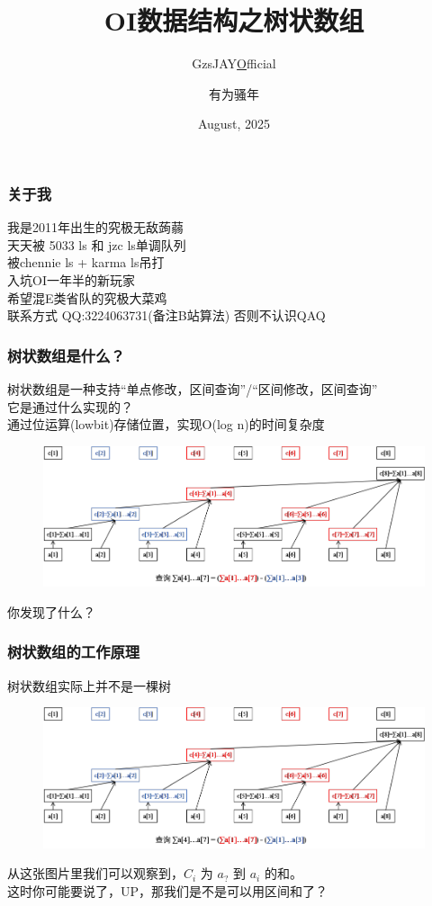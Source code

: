 \documentclass{beamer}
\title{OI数据结构之树状数组}
\author{GzsJAY\underline Official \and 有为骚年}
\institute{HI-OIER}
\date{August, 2025}
\begin{document}
	\frame{\titlepage}%
	
	\begin{frame}
		\frametitle{关于我}
		我是2011年出生的究极无敌蒟蒻 \\
		天天被 5033 ls 和 jzc ls单调队列 \\
		被chennie ls + karma ls吊打 \\
		入坑OI一年半的新玩家 \\
		希望混E类省队的究极大菜鸡 \\
		
		联系方式 
		QQ:3224063731(备注B站算法) 否则不认识QAQ
		\tableofcontents
	\end{frame}
	
	\begin{frame}
		\frametitle{树状数组是什么？}
			树状数组是一种支持“单点修改，区间查询”/“区间修改，区间查询” \\
			\pause
			它是通过什么实现的？ \\
			\pause
			通过位运算(lowbit)存储位置，实现O(log n)的时间复杂度 \\
			\pause
			\begin{figure}
				\centering
				\includegraphics[width=0.7\linewidth]{pic/BIT}
				\caption{}
				\label{fig:bit}
			\end{figure}
			\pause
			你发现了什么？\\
	\end{frame}
	
	\begin{frame}
		\frametitle{树状数组的工作原理}
		树状数组实际上并不是一棵树 \\
		\begin{figure}
			\centering
			\includegraphics[width=0.7\linewidth]{pic/BIT}
			\caption{}
			\label{fig:bit}
		\end{figure}
		\pause
		从这张图片里我们可以观察到，$C_i$ 为 $a_?$ 到 $a_i$ 的和。 \\
		\pause
		这时你可能要说了，UP，那我们是不是可以用区间和了？
	\end{frame}
	
\end{document}

